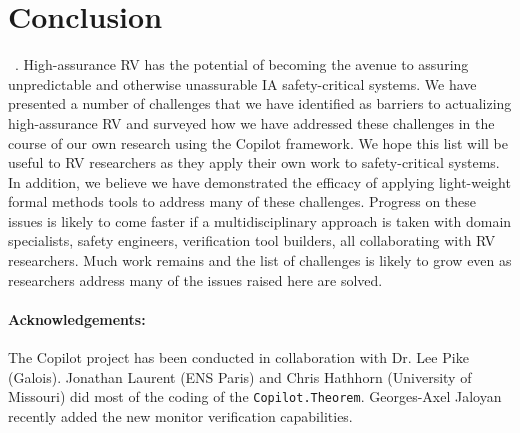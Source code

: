 \section{Conclusion}~\label{sec:conclusion}.  High-assurance RV has
the potential of becoming the avenue to assuring unpredictable and
otherwise unassurable IA safety-critical systems. We have presented a
number of challenges that we have identified as barriers to
actualizing high-assurance RV and surveyed how we have addressed these
challenges in the course of our own research using the Copilot
framework. We hope this list will be useful to RV researchers as they
apply their own work to safety-critical systems.  In addition, we
believe we have demonstrated the efficacy of applying light-weight
formal methods tools to address many of these challenges.  Progress on
these issues is likely to come faster if a multidisciplinary approach
is taken with domain specialists, safety engineers, verification tool
builders, all collaborating with RV researchers. Much work
remains and the list of challenges is likely to grow even as
researchers address many of the issues raised here are solved. 

\paragraph{Acknowledgements:} The Copilot project  has
been conducted in collaboration with Dr. Lee Pike (Galois).  Jonathan
Laurent (ENS Paris)  and Chris Hathhorn (University of Missouri) did
most of the coding of the {\tt Copilot.Theorem}.   Georges-Axel
Jaloyan  recently added the new  monitor verification capabilities. 